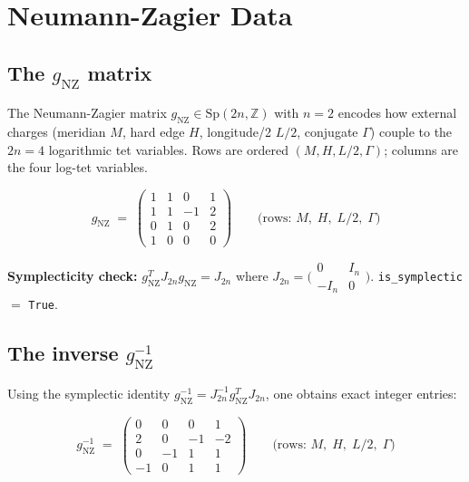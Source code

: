 \documentclass[12pt,a4paper]{article}
\newcommand{\gNZ}{g_{\mathrm{NZ}}}
\newcommand{\ZZ}{\mathbb{Z}}
\theoremstyle{definition}
\begin{document}
\section{Neumann-Zagier Data}

\subsection{The \texorpdfstring{$\gNZ$}{g\_NZ} matrix}

The Neumann-Zagier matrix $\gNZ \in \mathrm{Sp}(2n,\ZZ)$ with $n=2$
encodes how external charges (meridian $M$, hard edge $H$, longitude/2 $L/2$,
conjugate $\Gamma$) couple to the $2n=4$ logarithmic tet variables.
Rows are ordered $(M, H, L/2, \Gamma)$; columns are the four log-tet
variables.

\begin{equation}\label{eq:gNZ}
  \gNZ \;=\;
  \begin{pmatrix}
    1 & 1 & 0 & 1 \\
    1 & 1 & -1 & 2 \\
    0 & 1 & 0 & 2 \\
    1 & 0 & 0 & 0
  \end{pmatrix}
  \qquad
  \text{(rows: } M,\; H,\; L/2,\; \Gamma\text{)}
\end{equation}

\noindent
\textbf{Symplecticity check:} $\gNZ^T J_{2n} \gNZ = J_{2n}$
where $J_{2n} = \bigl(\begin{smallmatrix}0&I_n\\-I_n&0\end{smallmatrix}\bigr)$.
\texttt{is\_symplectic} $=$ \texttt{True}. \checkmark

\subsection{The inverse \texorpdfstring{$\gNZ^{-1}$}{g\_NZ\^{-1}}}

Using the symplectic identity
$\gNZ^{-1} = J_{2n}^{-1} \gNZ^T J_{2n}$, one obtains exact integer entries:

\begin{equation}\label{eq:gNZinv}
  \gNZ^{-1} \;=\;
  \begin{pmatrix}
    0 &  0 &  0 &  1 \\
    2 &  0 & -1 & -2 \\
    0 & -1 &  1 &  1 \\
   -1 &  0 &  1 &  1
  \end{pmatrix}
  \qquad
  \text{(rows: } M,\; H,\; L/2,\; \Gamma\text{)}
\end{equation}
\end{document}
